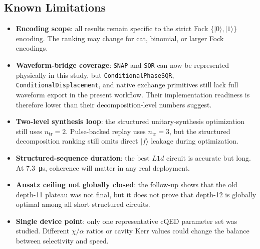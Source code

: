\documentclass[11pt, a4paper]{article}
\begin{document}
\subsection{Known Limitations}
\begin{itemize}
\item \textbf{Encoding scope}: all results remain specific to the strict Fock $\{|0\rangle, |1\rangle\}$ encoding. The ranking may change for cat, binomial, or larger Fock encodings.
\item \textbf{Waveform-bridge coverage}: \texttt{SNAP} and \texttt{SQR} can now be represented physically in this study, but \texttt{ConditionalPhaseSQR}, \texttt{ConditionalDisplacement}, and native exchange primitives still lack full waveform export in the present workflow. Their implementation readiness is therefore lower than their decomposition-level numbers suggest.
\item \textbf{Two-level synthesis loop}: the structured unitary-synthesis optimization still uses $n_\mathrm{tr}=2$. Pulse-backed replay uses $n_\mathrm{tr}=3$, but the structured decomposition ranking still omits direct $|f\rangle$ leakage during optimization.
\item \textbf{Structured-sequence duration}: the best $L1d$ circuit is accurate but long. At \SI{7.3}{\micro s}, coherence will matter in any real deployment.
\item \textbf{Ansatz ceiling not globally closed}: the follow-up shows that the old depth-11 plateau was not final, but it does not prove that depth-12 is globally optimal among all short structured circuits.
\item \textbf{Single device point}: only one representative cQED parameter set was studied. Different $\chi/\alpha$ ratios or cavity Kerr values could change the balance between selectivity and speed.
\end{itemize}
\end{document}

